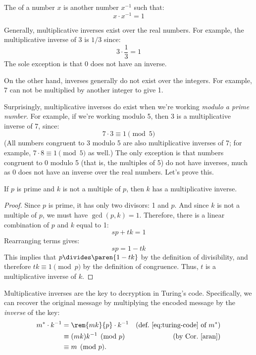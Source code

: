 The  of a number $x$ is another number
$x^{-1}$ such that:
%
\[
x \cdot x^{-1} = 1
\]

Generally, multiplicative inverses exist over the real numbers.  For
example, the multiplicative inverse of 3 is $1 / 3$ since:
%
\[
3 \cdot \frac{1}{3} = 1
\]
%
The sole exception is that 0 does not have an inverse.

On the other hand, inverses generally do not exist over the integers.
For example, 7 can not be multiplied by another integer to give 1.

Surprisingly, multiplicative inverses do exist when we're working
\textit{modulo a prime number}.  For example, if we're working modulo
5, then 3 is a multiplicative inverse of 7, since:
%
\[
7 \cdot 3 \equiv 1 \pmod{5}
\]
%
(All numbers congruent to 3 modulo 5 are also multiplicative inverses
of 7; for example, $7 \cdot 8 \equiv 1 \pmod{5}$ as well.)  The only
exception is that numbers congruent to 0 modulo 5 (that is, the
multiples of 5) do not have inverses, much as 0 does not have an
inverse over the real numbers.  Let's prove this.

\begin{lemma}
\label{lem:inverses}
If $p$ is prime and $k$ is not a multiple of $p$, then $k$ has a
multiplicative inverse.
\end{lemma}

\begin{proof}
Since $p$ is prime, it has only two divisors: 1 and $p$.  And since
$k$ is not a multiple of $p$, we must have $\gcd(p, k) = 1$.
Therefore, there is a linear combination of $p$ and $k$ equal to 1:
%
\[
s p + t k = 1
\]
%
Rearranging terms gives:
%
\[
s p = 1 - t k
\]
%
This implies that $p \divides \paren{1 - tk}$ by the definition of divisibility,
and therefore $tk \equiv 1 \pmod{p}$ by the definition of congruence.
Thus, $t$ is a multiplicative inverse of $k$.
\end{proof}

Multiplicative inverses are the key to decryption in Turing's code.
Specifically, we can recover the original message by multiplying the
encoded message by the \textit{inverse} of the key:
\begin{align*}
m^* \cdot k^{-1}
    & = \rem{mk}{p} \cdot k^{-1}
         & \text{(def.~\eqref{eq:turing-code} of $m^*$)}\\
    & \equiv (mk)k^{-1} \pmod{p} & \text{(by Cor.~\ref{aran})}\\
    & \equiv m \pmod{p}.
\end{align*}

